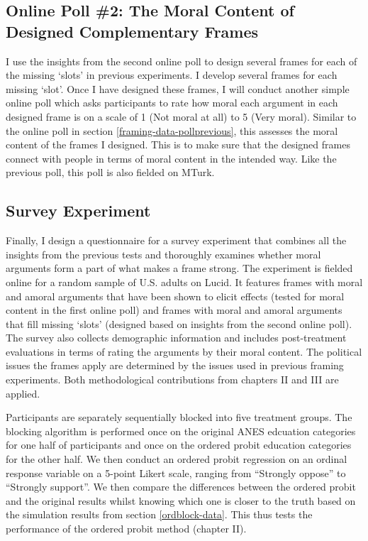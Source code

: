 \documentclass[12pt,econ]{sources/authesis}
\begin{document}
\hypertarget{framing-data-polldesigned}{%
\subsection{Online Poll \#2: The Moral Content of Designed Complementary Frames}\label{framing-data-polldesigned}}

I use the insights from the second online poll to design several frames for each of the missing `slots' in previous experiments. I develop several frames for each missing `slot'. Once I have designed these frames, I will conduct another simple online poll which asks participants to rate how moral each argument in each designed frame is on a scale of 1 (Not moral at all) to 5 (Very moral). Similar to the online poll in section \ref{framing-data-pollprevious}, this assesses the moral content of the frames I designed. This is to make sure that the designed frames connect with people in terms of moral content in the intended way. Like the previous poll, this poll is also fielded on MTurk.

\hypertarget{framing-data-survey}{%
\subsection{Survey Experiment}\label{framing-data-survey}}

Finally, I design a questionnaire for a survey experiment that combines all the insights from the previous tests and thoroughly examines whether moral arguments form a part of what makes a frame strong. The experiment is fielded online for a random sample of U.S. adults on Lucid. It features frames with moral and amoral arguments that have been shown to elicit effects (tested for moral content in the first online poll) and frames with moral and amoral arguments that fill missing `slots' (designed based on insights from the second online poll). The survey also collects demographic information and includes post-treatment evaluations in terms of rating the arguments by their moral content. The political issues the frames apply are determined by the issues used in previous framing experiments. Both methodological contributions from chapters II and III are applied.

Participants are separately sequentially blocked into five treatment groups. The blocking algorithm is performed once on the original ANES edcuation categories for one half of participants and once on the ordered probit education categories for the other half. We then conduct an ordered probit regression on an ordinal response variable on a 5-point Likert scale, ranging from ``Strongly oppose'' to ``Strongly support''. We then compare the differences between the ordered probit and the original results whilst knowing which one is closer to the truth based on the simulation results from section \ref{ordblock-data}. This thus tests the performance of the ordered probit method (chapter II).
\end{document}
